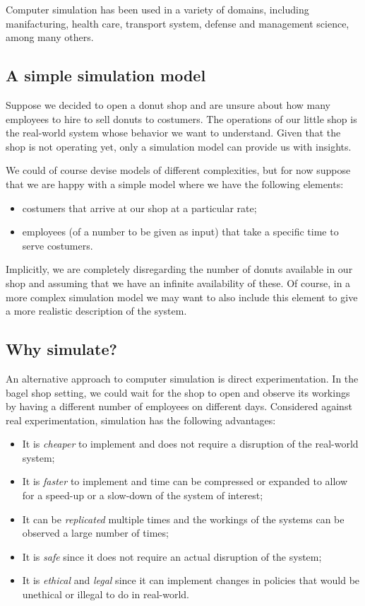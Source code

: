 \documentclass[
]{book}
\theoremstyle{definition}
\theoremstyle{definition}
\theoremstyle{definition}
\theoremstyle{definition}
\theoremstyle{remark}
\begin{document}
Computer simulation has been used in a variety of domains, including manifacturing, health care, transport system, defense and management science, among many others.

\hypertarget{a-simple-simulation-model}{%
\subsection{A simple simulation model}\label{a-simple-simulation-model}}

Suppose we decided to open a donut shop and are unsure about how many employees to hire to sell donuts to costumers. The operations of our little shop is the real-world system whose behavior we want to understand. Given that the shop is not operating yet, only a simulation model can provide us with insights.

We could of course devise models of different complexities, but for now suppose that we are happy with a simple model where we have the following elements:

\begin{itemize}
\item
  costumers that arrive at our shop at a particular rate;
\item
  employees (of a number to be given as input) that take a specific time to serve costumers.
\end{itemize}

Implicitly, we are completely disregarding the number of donuts available in our shop and assuming that we have an infinite availability of these. Of course, in a more complex simulation model we may want to also include this element to give a more realistic description of the system.

\hypertarget{why-simulate}{%
\subsection{Why simulate?}\label{why-simulate}}

An alternative approach to computer simulation is direct experimentation. In the bagel shop setting, we could wait for the shop to open and observe its workings by having a different number of employees on different days. Considered against real experimentation, simulation has the following advantages:

\begin{itemize}
\item
  It is \emph{cheaper} to implement and does not require a disruption of the real-world system;
\item
  It is \emph{faster} to implement and time can be compressed or expanded to allow for a speed-up or a slow-down of the system of interest;
\item
  It can be \emph{replicated} multiple times and the workings of the systems can be observed a large number of times;
\item
  It is \emph{safe} since it does not require an actual disruption of the system;
\item
  It is \emph{ethical} and \emph{legal} since it can implement changes in policies that would be unethical or illegal to do in real-world.
\end{itemize}
\end{document}

